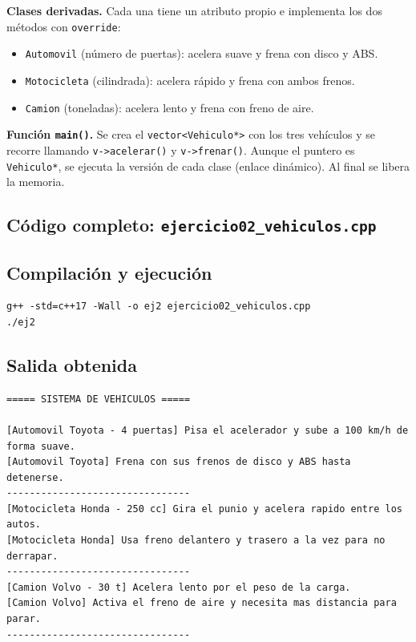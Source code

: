 \documentclass[12pt]{article}
\begin{document}
\textbf{Clases derivadas.} Cada una tiene un atributo propio e implementa los dos métodos con \texttt{override}:
\begin{itemize}[leftmargin=0.5cm]
    \item \texttt{Automovil} (número de puertas): acelera suave y frena con disco y ABS.
    \item \texttt{Motocicleta} (cilindrada): acelera rápido y frena con ambos frenos.
    \item \texttt{Camion} (toneladas): acelera lento y frena con freno de aire.
\end{itemize}

\textbf{Función \texttt{main()}.} Se crea el \texttt{vector<Vehiculo*>} con los tres vehículos y se recorre llamando \texttt{v->acelerar()} y \texttt{v->frenar()}. Aunque el puntero es \texttt{Vehiculo*}, se ejecuta la versión de cada clase (enlace dinámico). Al final se libera la memoria.

\subsection*{Código completo: \texttt{ejercicio02\_vehiculos.cpp}}



\subsection*{Compilación y ejecución}

\begin{lstlisting}[style=consola]
g++ -std=c++17 -Wall -o ej2 ejercicio02_vehiculos.cpp
./ej2
\end{lstlisting}

\subsection*{Salida obtenida}

\begin{lstlisting}[style=consola]
===== SISTEMA DE VEHICULOS =====

[Automovil Toyota - 4 puertas] Pisa el acelerador y sube a 100 km/h de forma suave.
[Automovil Toyota] Frena con sus frenos de disco y ABS hasta detenerse.
--------------------------------
[Motocicleta Honda - 250 cc] Gira el punio y acelera rapido entre los autos.
[Motocicleta Honda] Usa freno delantero y trasero a la vez para no derrapar.
--------------------------------
[Camion Volvo - 30 t] Acelera lento por el peso de la carga.
[Camion Volvo] Activa el freno de aire y necesita mas distancia para parar.
--------------------------------
\end{lstlisting}
\end{document}
